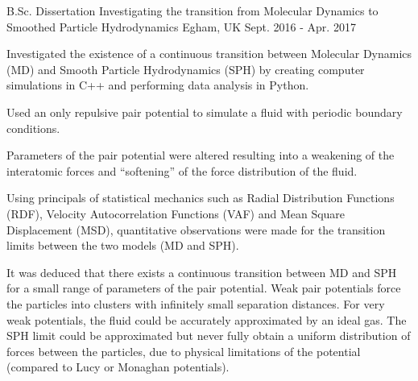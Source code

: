 \begin{cventries}
	\cventry
		{B.Sc. Dissertation}
		{Investigating the transition from Molecular Dynamics to Smoothed Particle Hydrodynamics}
		{Egham, UK}
		{Sept. 2016 - Apr. 2017}
		{
			\begin{cvitems}
				\item {Investigated the existence of a continuous transition between Molecular Dynamics (MD) and Smooth Particle Hydrodynamics (SPH) by creating computer simulations in C++ and performing data analysis in Python.}
				\item {Used an only repulsive pair potential to 		simulate a fluid with periodic boundary conditions.}
				\item {Parameters of the pair potential were altered resulting into a weakening of the interatomic forces and “softening” of the force distribution of the fluid.}
				\item {Using principals of statistical mechanics such as Radial Distribution Functions (RDF), Velocity Autocorrelation Functions (VAF) and Mean Square Displacement (MSD), quantitative observations were made for the transition limits between the two models (MD and SPH).}
				\item {It was deduced that there exists a continuous transition between MD and SPH for a small range of parameters of the pair potential. Weak pair potentials force the particles into clusters with infinitely small separation distances. For very weak potentials, the fluid could be accurately approximated by an ideal gas. The SPH limit could be approximated but never fully obtain a uniform distribution of forces between the particles, due to physical limitations of the potential (compared to Lucy or Monaghan potentials).}
			\end{cvitems}
		}	
	

\end{cventries}
